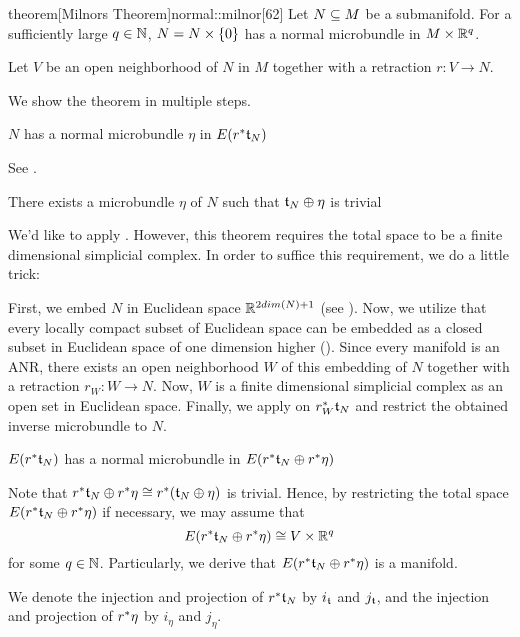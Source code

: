 \begin{scope} \newcommand{\rwhitney} { \whitney{\ind{r}\bt_N}{\ind{r}\eta} } \newcommand{\rtn} { \ind{r}\bt_N }

\begin{mystatement}{theorem}[Milnors Theorem]{normal::milnor}[62] Let $N \subseteq{} M$ be a submanifold. For a sufficiently large $q \in \mathbb{N}$, $N = N \times{} \{0\}$ has a normal microbundle in $M \times \mathbb{R}^q$. \end{mystatement}

\begin{myproof} Let $V$ be an open neighborhood of $N$ in $M$ together with a retraction $r: V \to N$.

We show the theorem in multiple steps. \begin{steps} \item $N$ has a normal microbundle $\eta$ in $E(r^*\mathfrak{t}_N)$

See .

\item There exists a microbundle $\eta$ of $N$ such that $\mathfrak{t}_N \oplus \eta$ is trivial

We'd like to apply . However, this theorem requires the total space to be a finite dimensional simplicial complex. In order to suffice this requirement, we do a little trick:

First, we embed $N$ in Euclidean space $\mathbb{R}^{2dim(N) + 1}$ (see \cite[p.60]{dimension}).
Now, we utilize that every locally compact subset of Euclidean space can be embedded as a closed subset in Euclidean space of one dimension higher (\cite[prop. 18.4.2]{tom}).
Since every manifold is an ANR, there exists an open neighborhood $W$ of this embedding of $N$ together with a retraction $r_W: W \to N$.
Now, $W$ is a finite dimensional simplicial complex as an open set in Euclidean space.
Finally, we apply  on $r_W^*\mathfrak{t}_N$ and restrict the obtained inverse microbundle to $N$.

\item $E(\rtn)$ has a normal microbundle in $E(\rwhitney)$

Note that $\rwhitney \cong \ind{r}(\whitney{\bt_N}{\eta})$ is trivial. Hence, by restricting the total space $E(\rwhitney)$ if necessary, we may assume that \[ E(\rwhitney) \cong V \cross \R^q \] for some $q \in \mathbb{N}$. Particularly, we derive that $E(\rwhitney)$ is a manifold.

We denote the injection and projection of $\rtn$ by $i_{\mathfrak{t}}$ and $j_{\mathfrak{t}}$, and the injection and projection of $r^*\eta$ by $i_{\eta}$ and $j_{\eta}$.


\end{steps}
\end{myproof}
\end{scope}
